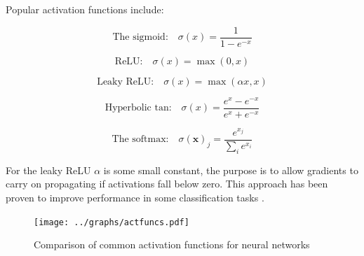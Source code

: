     Popular activation functions include:
    \begin{multicols}{2}


      \begin{equation}
        \text{The sigmoid:}\quad
        \sigma (x) = \frac{1}{1-e^{-x}} \label{eq:sigmoid}
      \end{equation}


      \begin{equation}
        \text{ReLU:}\quad
        \sigma(x) = \max(0,x)
      \end{equation}

      \begin{equation}
        \text{Leaky ReLU:}\quad
        \sigma(x) = \max(\alpha x,x)
      \end{equation}


      \begin{equation}
        \text{Hyperbolic tan:}\quad
        \sigma(x)=\frac{e^x - e^{-x}}{e^x + e^{-x}}
      \end{equation}


      \begin{equation}
        \text{The softmax:}\quad
        \sigma(\mathbf{x})_j = \frac{e^{x_j}}{\sum_i e^{x_i}}
      \end{equation}


    \end{multicols}

    For the leaky ReLU $\alpha$ is some small constant, the purpose is to allow gradients to carry on
    propagating if activations fall below zero. This approach has been proven to improve performance in some classification
    tasks \cite{Xu2015}.

    \begin{figure} \label{disfagraph}
      \center
      \texttt{[image: ../graphs/actfuncs.pdf]}
      \caption{Comparison of common activation functions for neural networks}
    \end{figure}



